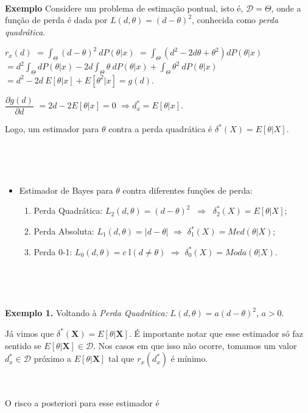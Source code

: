 \documentclass[
]{book}
\begin{document}
\(~\)

\textbf{Exemplo} Considere um problema de estimação pontual, isto é, \(\mathcal{D}=\Theta\), onde a função de perda é dada por \(L(d,\theta)=(d-\theta)^2\), conhecida como \emph{perda quadrática}.

\(r_x(d)\) \(=\displaystyle \int_\Theta(d-\theta)^2~dP(\theta|x)\)
\(=\displaystyle \int_\Theta \left(d^2 - 2d\theta + \theta^2\right) dP(\theta|x)\) \(=d^2\displaystyle\int_\Theta dP(\theta|x) - 2d\int_\Theta\theta ~dP(\theta|x) + \int_\Theta \theta^2 ~dP(\theta|x)\) \(=d^2-2d~E[\theta|x]+E[\theta^2|x]=g(d)\).

\(\dfrac{\partial g(d)}{\partial d}\) \(=2d-2E[\theta|x]=0\) \(\Rightarrow {d}_x^*=E[\theta|x]\).

Logo, um estimador para \(\theta\) contra a perda quadrática é \({\delta}^*(X)=E[\theta|X]\).

\(~\)

\(~\)

\begin{itemize}
\item
  Estimador de Bayes para \(\theta\) contra diferentes funções de perda:

  \begin{enumerate}
  \def\labelenumi{\arabic{enumi}.}
  \item
    Perda Quadrática: \(L_2(d,\theta)=(d-\theta)^2\) \(~\Longrightarrow~\) \({\delta}_2^*(X)=E[\theta|X]\);
  \item
    Perda Absoluta: \(L_1(d,\theta)=|d-\theta|\) \(\Longrightarrow\) \({\delta}_1^*(X)=Med(\theta|X)\);
  \item
    Perda 0-1: \(L_0(d,\theta)=c~\mathbb{I}(d\neq\theta)\) \(\Longrightarrow\) \({\delta}_0^*(X)=Moda(\theta|X)\).
  \end{enumerate}
\end{itemize}

\(~\)

\(~\)

\textbf{Exemplo 1.} Voltando à \emph{Perda Quadrática:} \(L(d,\theta)=a(d-\theta)^2\), \(a>0\).

Já vimos que \(\delta^*(\boldsymbol X)=E[\theta|\boldsymbol X]\). É importante notar que esse estimador só faz sentido se \(E[\theta|\boldsymbol X]\in \mathcal{D}\). Nos casos em que isso não ocorre, tomamos um valor \({d}_x^* \in \mathcal{D}\) próximo a \(E[\theta|\boldsymbol X]\) tal que \(r_x\left({d}_x^*\right)\) é mínimo.

\(~\)

O risco a posteriori para esse estimador é
\end{document}

